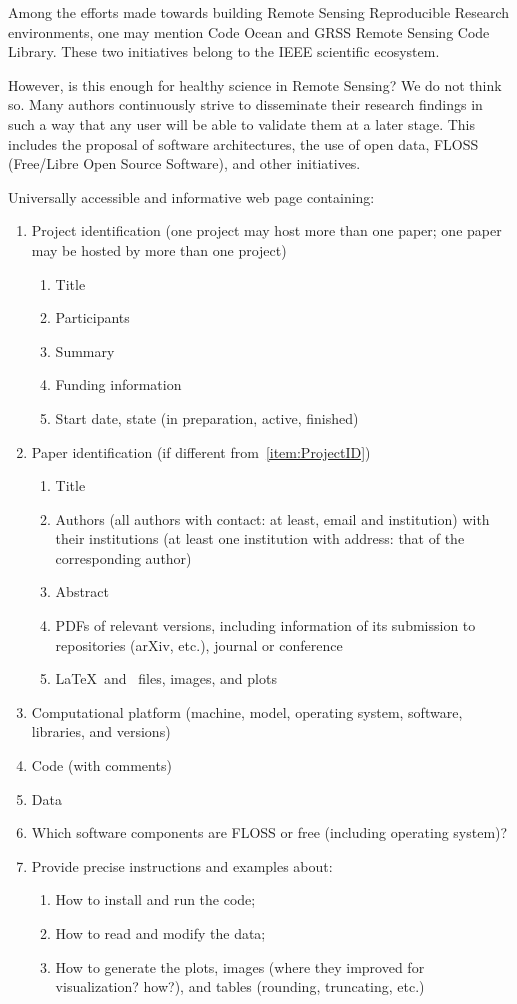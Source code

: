 \documentclass[journal]{IEEEtran}
\begin{document}
Among the efforts made towards building Remote Sensing Reproducible Research environments, one may mention Code Ocean and GRSS Remote Sensing Code Library. 
These two initiatives belong to the IEEE scientific ecosystem. 
	
However, is this enough for healthy science in Remote Sensing? 
We do not think so. 
Many authors continuously strive to disseminate their research findings in such a way that any user will be able to validate them at a later stage. 
This includes the proposal of software architectures, the use of open data, FLOSS (Free/Libre Open Source Software), and other initiatives.
		
Universally accessible and informative web page containing:
	\begin{enumerate}
		\item\label{item:ProjectID} Project identification (one project may host more than one paper; one paper may be hosted by more than one project)
		\begin{enumerate}
			\item Title
			\item Participants
			\item Summary
			\item Funding information
			\item Start date, state (in preparation, active, finished)
		\end{enumerate}
		\item Paper identification (if different from~\ref{item:ProjectID})
		\begin{enumerate}
			\item Title
			\item Authors (all authors with contact: at least, email and institution) with their institutions (at least one institution with address: that of the corresponding author)
			\item Abstract
			\item PDFs of relevant versions, including information of its submission to repositories (arXiv, etc.), journal or conference
			\item\label{item:SourceDocumentFiles} \LaTeX\ and \BibTeX\ files, images, and plots
		\end{enumerate}
		\item\label{item:Platform} Computational platform (machine, model, operating system, software, libraries, and versions)
		\item Code (with comments)
		\item Data
		\item Which software components are FLOSS or free (including operating system)?
		\item Provide precise instructions and examples about:
		\begin{enumerate}
			\item How to install and run the code;
			\item How to read and modify the data;
			\item How to generate the plots, images (where they improved for visualization? how?), and tables (rounding, truncating, etc.)
		\end{enumerate}
	\end{enumerate}
	
\end{document}
